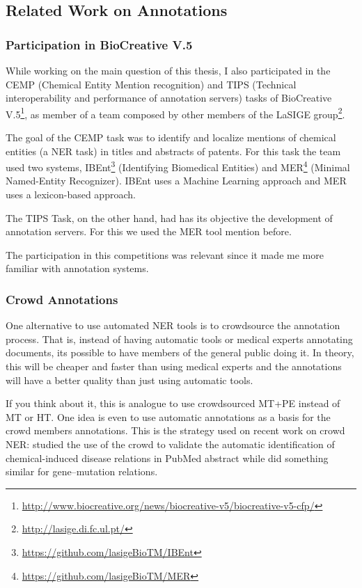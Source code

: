 \subsection{Related Work on Annotations}

\subsubsection{Participation in BioCreative V.5}
\label{biocreative}

While working on the main question of this thesis, I also participated in the CEMP (Chemical Entity Mention recognition) and TIPS (Technical interoperability and performance of annotation servers) tasks of BioCreative V.5\footnote{\url{http://www.biocreative.org/news/biocreative-v5/biocreative-v5-cfp/}}, as member of a team composed by other members of the LaSIGE group\footnote{\url{http://lasige.di.fc.ul.pt/}}.

The goal of the CEMP task was to identify and localize mentions of chemical entities (a NER task) in titles and abstracts of patents. For this task the team used two systems, IBEnt\footnote{\url{https://github.com/lasigeBioTM/IBEnt}} (Identifying Biomedical Entities) and MER\footnote{\url{https://github.com/lasigeBioTM/MER}} (Minimal Named-Entity Recognizer). IBEnt uses a Machine Learning approach and MER uses a lexicon-based approach. 

The TIPS Task, on the other hand, had has its objective the development of annotation servers. For this we used the MER tool mention before. 


The participation in this competitions was relevant since it made me more familiar with annotation systems.

\subsubsection{Crowd Annotations}

One alternative to use automated NER tools is to crowdsource the annotation process. That is, instead of having automatic tools or medical experts annotating documents, its possible to have members of the general public doing it. In theory, this will be cheaper and faster than using medical experts and the annotations will have a better quality than just using automatic tools.

If you think about it, this is analogue to use crowdsourced MT+PE instead of MT or HT. One idea is even to use automatic annotations as a basis for the crowd members annotations. This is the strategy used on recent work on crowd NER: \citep{Li2016} studied the use of the crowd to validate the automatic identification of chemical-induced disease relations in PubMed abstract while \citep{Burger2014} did something similar for gene–mutation relations.

